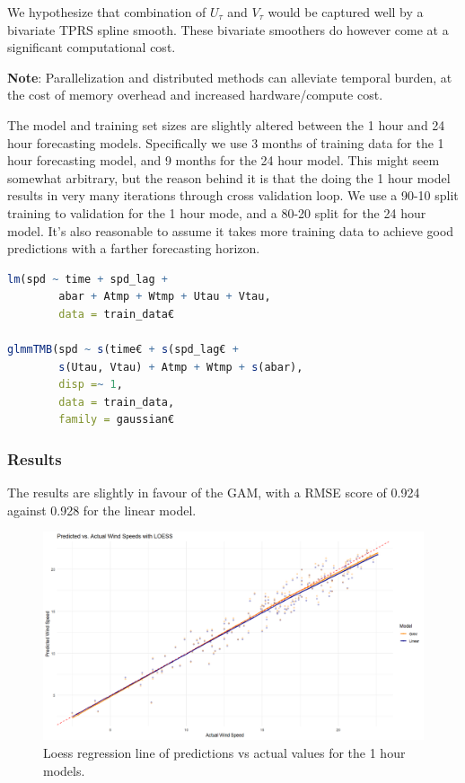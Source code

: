 \documentclass[12pt, twoside,hidelinks]{article}
\theoremstyle{definition}
\numberwithin{equation}{section}
\begin{document}
We hypothesize that combination of $U_\tau$ and $V_\tau$ would be captured well by a bivariate TPRS spline smooth. These bivariate smoothers do however come at a significant computational cost.

\textbf{Note}: Parallelization and distributed methods can alleviate temporal burden, at the cost of memory overhead and increased hardware/compute cost.
\newline

The model and training set sizes are slightly altered between the 1 hour and 24 hour forecasting models. Specifically we use 3 months of training data for the 1 hour forecasting model, and 9 months for the 24 hour model. This might seem somewhat arbitrary, but the reason behind it is that the doing the 1 hour model results in very many iterations through cross validation loop. We use a 90-10 split training to validation for the 1 hour mode, and a 80-20 split for the 24 hour model. It's also reasonable to assume it takes more training data to achieve good predictions with a farther forecasting horizon.

\begin{lstlisting}[language=R]
lm(spd ~ time + spd_lag +
        abar + Atmp + Wtmp + Utau + Vtau,
        data = train_data€

glmmTMB(spd ~ s(time€ + s(spd_lag€ +
        s(Utau, Vtau) + Atmp + Wtmp + s(abar),
        disp =~ 1,
        data = train_data,
        family = gaussian€
\end{lstlisting}

\subsubsection{Results}
The results are slightly in favour of the GAM, with a RMSE score of 0.924 against 0.928 for the linear model.

\begin{figure}[ht]
    \centering
    \includegraphics[width=\linewidth]{visuals/wind_model_speed/loess_wind_1.png}
    \caption{Loess regression line of predictions vs actual values for the 1 hour models.}
    \label{log_return_alt_rmse_folds}
\end{figure}
\end{document}
